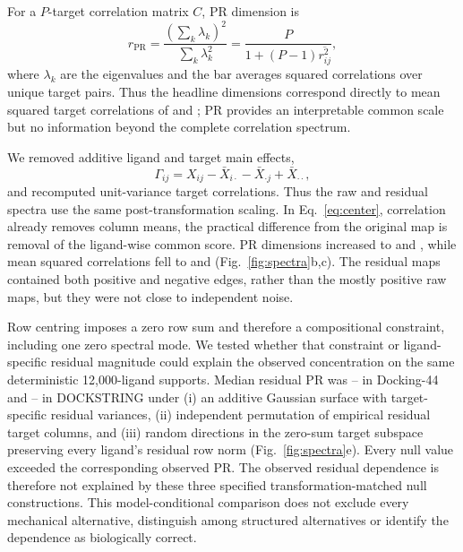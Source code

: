 \documentclass[11pt]{article}
\begin{document}
For a $P$-target correlation matrix $C$, PR dimension is
\begin{equation}
r_{\mathrm{PR}}
=\frac{\left(\sum_k\lambda_k\right)^2}{\sum_k\lambda_k^2}
=\frac{P}{1+(P-1)\overline{r_{ij}^{2}}},
\label{eq:pr}
\end{equation}
where $\lambda_k$ are the eigenvalues and the bar averages squared correlations
over unique target pairs. Thus the headline dimensions correspond directly to
mean squared target correlations of \DffRawMeanRtwo{} and \DsRawMeanRtwo{};
PR provides an interpretable common scale but no information beyond the complete
correlation spectrum.

We removed additive ligand and target main effects,
\begin{equation}
\Gamma_{ij}=X_{ij}-\bar X_{i\cdot}-\bar X_{\cdot j}+\bar X_{\cdot\cdot},
\label{eq:center}
\end{equation}
and recomputed unit-variance target correlations. Thus the raw and residual
spectra use the same post-transformation scaling. In Eq.~\ref{eq:center}, correlation already removes column
means, the practical difference from the original map is removal of the
ligand-wise common score. PR dimensions increased to \DffResidualPR{} and
\DsResidualPR{}, while mean squared correlations fell to
\DffResidualMeanRtwo{} and \DsResidualMeanRtwo{} (Fig.~\ref{fig:spectra}b,c).
The residual maps contained both positive and negative edges, rather than the
mostly positive raw maps, but they were not close to independent noise.

Row centring imposes a zero row sum and therefore a compositional constraint,
including one zero spectral mode. We tested whether that constraint or
ligand-specific residual magnitude could explain the observed concentration on
the same deterministic 12,000-ligand supports. Median residual PR was
\DffNullMedianLow{}--\DffNullMedianHigh{} in Docking-44 and
\DsNullMedianLow{}--\DsNullMedianHigh{} in DOCKSTRING under (i) an additive
Gaussian surface with target-specific residual variances, (ii) independent
permutation of empirical residual target columns, and (iii) random directions
in the zero-sum target subspace preserving every ligand's residual row norm
(Fig.~\ref{fig:spectra}e). Every null value exceeded the corresponding observed
PR. The observed residual dependence is therefore not explained by these three
specified transformation-matched null constructions. This model-conditional
comparison does not exclude every mechanical alternative, distinguish among
structured alternatives or identify the dependence as biologically correct.
\end{document}
